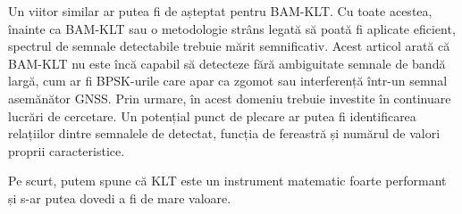 \documentclass[12pt]{report}
\begin{document}
Un viitor similar ar putea fi de așteptat pentru BAM-KLT. Cu toate acestea, înainte ca BAM-KLT sau o metodologie strâns legată să poată fi aplicate eficient, spectrul de semnale detectabile trebuie mărit semnificativ. Acest articol arată că BAM-KLT nu este încă capabil să detecteze fără ambiguitate semnale de bandă largă, cum ar fi BPSK-urile care apar ca zgomot sau interferență într-un semnal asemănător GNSS. Prin urmare, în acest domeniu trebuie investite în continuare lucrări de cercetare. Un potențial punct de plecare ar putea fi identificarea relațiilor dintre semnalele de detectat, funcția de fereastră și numărul de valori proprii caracteristice.

Pe scurt, putem spune că KLT este un instrument matematic foarte performant și s-ar putea dovedi a fi de mare valoare.
\end{document}

